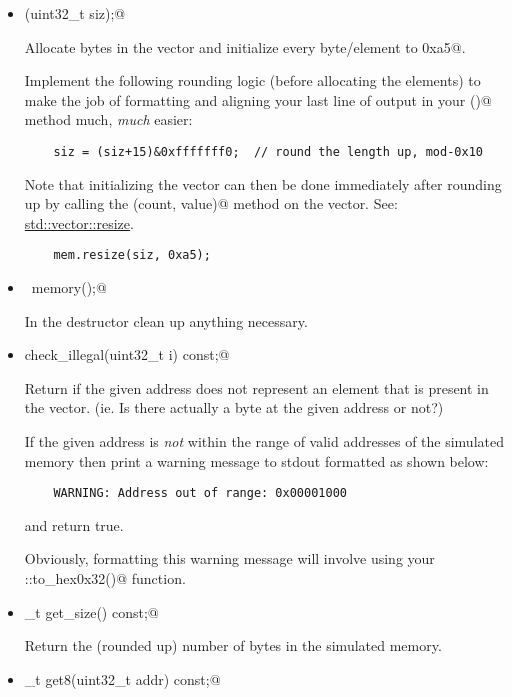 \documentclass[11pt]{article}
\begin{document}
\begin{itemize}
\item \verb@memory(uint32_t siz);@

Allocate \verb@siz@ bytes in the \verb@mem@ vector and initialize every byte/element to \verb@0xa5@.

Implement the following rounding logic (before allocating the \verb@siz@ elements)
to make the job of formatting and aligning your last line of output in your \verb@dump()@
method much, {\em much} easier:
\begin{verbatim}
    siz = (siz+15)&0xfffffff0;  // round the length up, mod-0x10
\end{verbatim}

Note that initializing the \verb@mem@ vector can then be done immediately after rounding
up \verb@siz@ by calling the \verb@resize(count, value)@ method on the \verb@mem@ vector.  
See: \href{https://en.cppreference.com/w/cpp/container/vector/resize}{std::vector::resize}.
\begin{verbatim}
    mem.resize(siz, 0xa5);
\end{verbatim}


\item \verb@~memory();@

In the destructor clean up anything necessary.

\item \verb@bool check_illegal(uint32_t i) const;@

Return \verb@true@ if the given address \verb@i@ does not represent an element that is present
in the \verb@mem@ vector.  (ie. Is there actually a byte at the given address or not?)

If the given address is {\em not} within the range of valid addresses of the simulated memory then 
print a warning message to stdout formatted as shown below:
\begin{verbatim}
    WARNING: Address out of range: 0x00001000
\end{verbatim}
and return true.

Obviously, formatting this warning message will involve using your \verb@hex::to_hex0x32()@ function.

\item {}_t get_size() const;@

Return the (rounded up) number of bytes in the simulated memory.

\item {}_t get8(uint32_t addr) const;@


\end{itemize}
\end{document}
